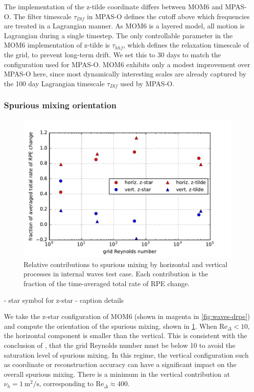 The implementation of the z-tilde coordinate differs between MOM6 and MPAS-O. The filter timescale $\tau_{Dlf}$ in MPAS-O defines the cutoff above which frequencies are treated in a Lagrangian manner. As MOM6 is a layered model, all motion is Lagrangian during a single timestep. The only controllable parameter in the MOM6 implementation of z-tilde is $\tau_{hhf}$, which defines the relaxation timescale of the grid, to prevent long-term drift. We set this to 30 days to match the configuration used for MPAS-O. MOM6 exhibits only a modest improvement over MPAS-O here, since most dynamically interesting scales are already captured by the 100 day Lagrangian timescale $\tau_{Dlf}$ used by MPAS-O.

\subsubsection{Spurious mixing orientation}

\begin{figure}
  \includegraphics{../plots/internal_waves_drpe_split.pdf}
  \caption{\label{fig:waves-drpesplit} Relative contributions to spurious mixing by horizontal and vertical processes in internal waves test case. Each contribution is the fraction of the time-averaged total rate of RPE change.}
\end{figure}

- star symbol for z-star
- caption details

We take the z-star configuration of MOM6 (shown in magenta in \cref{fig:waves-drpe}) and compute the orientation of the spurious mixing, shown in \cref{fig:waves-drpesplit}. When $\mathrm{Re}_\Delta < 10$, the horizontal component is smaller than the vertical. This is consistent with the conclusion of \citet{ilicak12}, that the grid Reynolds number must be below 10 to avoid the saturation level of spurious mixing. In this regime, the vertical configuration such as coordinate or reconstruction accuracy can have a significant impact on the overall spurious mixing. There is a minimum in the vertical contribution at $\nu_h = \SI{1}{\square\metre\per\second}$, corresponding to $\mathrm{Re}_\Delta \approx 400$.

